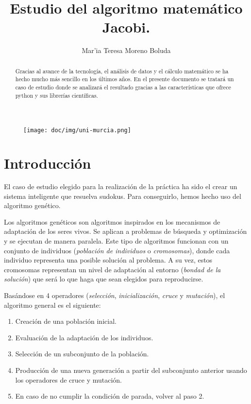 \documentclass[a4,11pt]{article}
\title{Estudio del algoritmo matem\'atico Jacobi.}
\begin{document}
\maketitle
\begin{figure}[htb]
\begin{center}
\texttt{[image: doc/img/uni-murcia.png]}
\end{center}
\end{figure}

\author{Mar'ia Teresa Moreno Boluda}


\begin{abstract}

Gracias al avance de la tecnología, el análisis de datos y el cálculo matemático se ha hecho mucho más sencillo en los últimos años. En el presente documento se tratará un caso de estudio donde se analizará el resultado gracias a las características que ofrece python y sus librerías científicas.

\end{abstract}

\newpage
\tableofcontents
\newpage

\section{Introducción}

\indent El caso de estudio elegido para la realización de la práctica ha sido el crear un sistema inteligente que resuelva sudokus. Para conseguirlo, hemos hecho uso del algoritmo genético.


Los algoritmos genéticos son algoritmos inspirados en los mecanismos de adaptación de los seres vivos. Se aplican a problemas de búsqueda y optimización y se ejecutan de manera paralela. Este tipo de algoritmos funcionan con un conjunto de individuos (\emph{población de individuos} o \emph{cromosomas}), donde cada individuo representa una posible solución al problema. A su vez, estos cromosomas representan un nivel de adaptación al entorno (\emph{bondad de la solución}) que será lo que haga que sean elegidos para reproducirse.

Basándose en 4 operadores (\emph{selección}, \emph{inicialización}, \emph{cruce} y \emph{mutación}), el algoritmo general es el siguiente:

\begin{enumerate}

\item Creación de una población inicial.

\item Evaluación de la adaptación de los individuos.

\item Selección de un subconjunto de la población.

\item Producción de una nueva generación a partir del subconjunto 
anterior usando los operadores de cruce y mutación.

\item En caso de no cumplir la condición de parada, volver al paso 2.

\end{enumerate}
\end{document}
